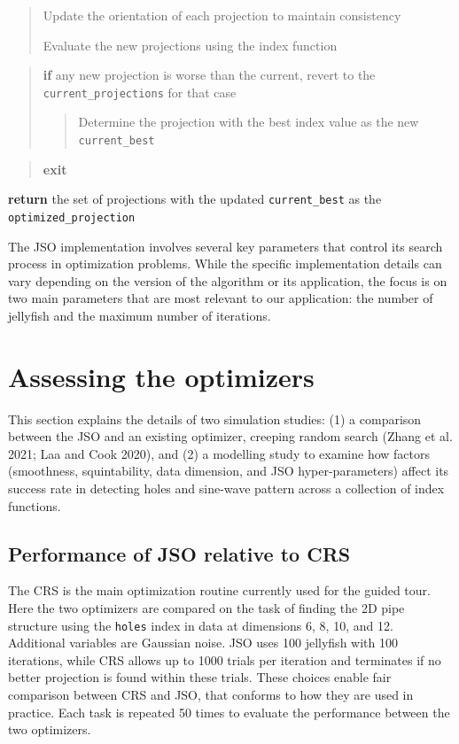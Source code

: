 \documentclass[
  12pt,
]{interact}
\theoremstyle{plain}
\begin{document}
\begin{tcolorbox}
\begin{quote}
Update the orientation of each projection to maintain consistency

Evaluate the new projections using the index function
\end{quote}

\begin{quote}
\textbf{if} any new projection is worse than the current, revert to the
\texttt{current\_projections} for that case

\begin{quote}
Determine the projection with the best index value as the new
\texttt{current\_best}
\end{quote}
\end{quote}

\begin{quote}
\textbf{exit}
\end{quote}

\textbf{return} the set of projections with the updated
\texttt{current\_best} as the \texttt{optimized\_projection}

\end{tcolorbox}

The JSO implementation involves several key parameters that control its
search process in optimization problems. While the specific
implementation details can vary depending on the version of the
algorithm or its application, the focus is on two main parameters that
are most relevant to our application: the number of jellyfish and the
maximum number of iterations.

\section{Assessing the optimizers}\label{sec-sim-deets}

This section explains the details of two simulation studies: (1) a
comparison between the JSO and an existing optimizer, creeping random
search (Zhang et al. 2021; Laa and Cook 2020), and (2) a modelling study
to examine how factors (smoothness, squintability, data dimension, and
JSO hyper-parameters) affect its success rate in detecting holes and
sine-wave pattern across a collection of index functions.

\subsection{Performance of JSO relative to CRS}\label{sec-app-1}

The CRS is the main optimization routine currently used for the guided
tour. Here the two optimizers are compared on the task of finding the 2D
pipe structure using the \texttt{holes} index in data at dimensions 6,
8, 10, and 12. Additional variables are Gaussian noise. JSO uses 100
jellyfish with 100 iterations, while CRS allows up to 1000 trials per
iteration and terminates if no better projection is found within these
trials. These choices enable fair comparison between CRS and JSO, that
conforms to how they are used in practice. Each task is repeated 50
times to evaluate the performance between the two optimizers.
\end{document}
